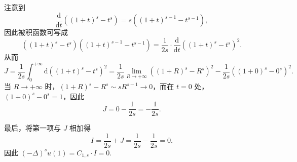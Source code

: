 \begin{solution}
\begin{enumerate}
        注意到
        \[
        \frac{\mathrm{d}}{\mathrm{d}t}\left(\left(1+t\right)^{s} - t^{s}\right) = s\left(\left(1+t\right)^{s-1} - t^{s-1}\right),
        \]
        因此被积函数可写成
        \[
        \left(\left(1+t\right)^{s} - t^{s}\right)\left(\left(1+t\right)^{s-1} - t^{s-1}\right) = \frac{1}{2s} \cdot \frac{\mathrm{d}}{\mathrm{d}t}\left(\left(1+t\right)^{s} - t^{s}\right)^{2}.
        \]
        从而
        \[
        J = \frac{1}{2s} \int_{0}^{+\infty} \mathrm{d}\left(\left(1+t\right)^{s} - t^{s}\right)^{2} = \frac{1}{2s} \lim_{R\to+\infty} \left(\left(1+R\right)^{s} - R^{s}\right)^{2} - \frac{1}{2s} \left(\left(1+0\right)^{s} - 0^{s}\right)^{2}.
        \]
        当 \(R\to+\infty\) 时，\(\left(1+R\right)^{s} - R^{s} \sim s R^{s-1} \to 0\)，而在 \(t=0\) 处，\(\left(1+0\right)^{s} - 0^{s} = 1\)，因此
        \[
        J = 0 - \frac{1}{2s} = -\frac{1}{2s}.
        \]

        最后，将第一项与 \(J\) 相加得
        \[
        I = \frac{1}{2s} + J = \frac{1}{2s} - \frac{1}{2s} = 0.
        \]
        因此 \((-\Delta)^{s}u(1) = C_{1,s} \cdot I = 0\).
    \end{enumerate}
\end{solution}